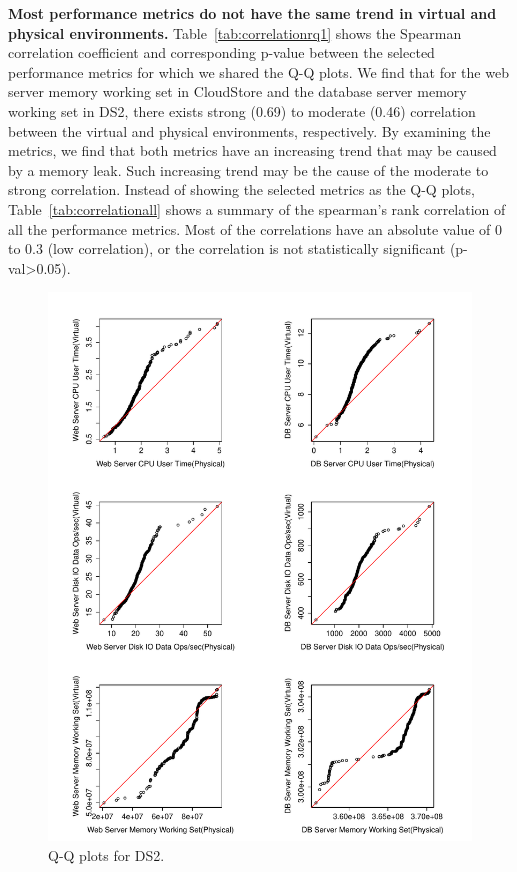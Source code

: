 \textbf{Most performance metrics do not have the same trend in virtual and physical environments.} Table~\ref{tab:correlationrq1} shows the Spearman correlation coefficient and corresponding p-value between the selected performance metrics for which we shared the Q-Q plots. We find that for the web server memory working set in CloudStore and the database server memory working set in DS2, there exists strong (0.69) to moderate (0.46) correlation between the virtual and physical environments, respectively. By examining the metrics, we find that both metrics have an increasing trend that may be caused by a memory leak. Such increasing trend may be the cause of the moderate to strong correlation. Instead of showing the selected metrics as the Q-Q plots, Table~\ref{tab:correlationall} shows a summary of the spearman's rank correlation of all the performance metrics. Most of the correlations have an absolute value of 0 to 0.3 (low correlation), or the correlation is not statistically significant (p-val\textgreater0.05).


\noindent{}


\begin{figure}[thb]
	\centering
	\includegraphics[width=0.9\columnwidth]{figures/ds2_qq_red.pdf}
	\caption{Q-Q plots for DS2.}
	\label{fig:qqds2}
\end{figure}




